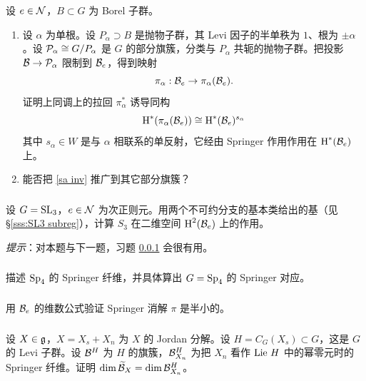 \subsubsection{}\label{exI:inv} 设 $e\in\mathcal{N}$，$B\subset G$ 为 Borel 子群。
\begin{enumerate}
\item 设 $\alpha$ 为单根。设 $P_{\alpha}\supset B$ 是抛物子群，其 Levi 因子的半单秩为 $1$、根为 $\pm\alpha$。设 $\mathcal{P}_{\alpha}\cong G/P_{\alpha}$ 是 $G$ 的部分旗簇，分类与 $P_{\alpha}$ 共轭的抛物子群。把投影 $\mathcal{B}\to \mathcal{P}_{\alpha}$ 限制到 $\mathcal{B}_{e}$，得到映射
\begin{equation*}
\pi_{\alpha}: \mathcal{B}_{e}\to \pi_{\alpha}(\mathcal{B}_{e}).
\end{equation*}
证明上同调上的拉回 $\pi^{*}_{\alpha}$ 诱导同构
\begin{equation}\label{sa inv}
\textup{H}^{*}({\pi_{\alpha}(\mathcal{B}_{e})})\cong \textup{H}^{*}({\mathcal{B}_{e}})^{s_{\alpha}}
\end{equation}
其中 $s_{\alpha}\in W$ 是与 $\alpha$ 相联系的单反射，它经由 Springer 作用作用在 $\textup{H}^{*}({\mathcal{B}_{e}})$ 上。
\item 能否把 \eqref{sa inv} 推广到其它部分旗簇？
\end{enumerate}

\subsubsection{}\label{exI:SL3} 设 $G=\textup{SL}_{3}$，$e\in\mathcal{N}$ 为次正则元。用两个不可约分支的基本类给出的基（见 \S\ref{sss:SL3 subreg}），计算 $S_{3}$ 在二维空间 $\textup{H}^{2}({\mathcal{B}_{e}})$ 上的作用。

{\em 提示}：对本题与下一题，习题 \ref{exI:inv} 会很有用。

\subsubsection{}\label{exI:Sp4} 描述 $\textup{Sp}_{4}$ 的 Springer 纤维，并具体算出 $G=\textup{Sp}_{4}$ 的 Springer 对应。

\subsubsection{} 用 $\mathcal{B}_{e}$ 的维数公式验证 Springer 消解 $\pi$ 是半小的。

\subsubsection{}\label{exI:dim BX} 设 $X\in\mathfrak{g}$，$X=X_{s}+X_{n}$ 为 $X$ 的 Jordan 分解。设 $H=C_{G}(X_{s})\subset G$，这是 $G$ 的 Levi 子群。设 $\mathcal{B}^{H}$ 为 $H$ 的旗簇，$\mathcal{B}^{H}_{X_{n}}$ 为把 $X_{n}$ 看作 $\textup{Lie}\  H$ 中的幂零元时的 Springer 纤维。证明 $\dim\widetilde{\mathcal{B}}_{X}=\dim \mathcal{B}^{H}_{X_{n}}$。


